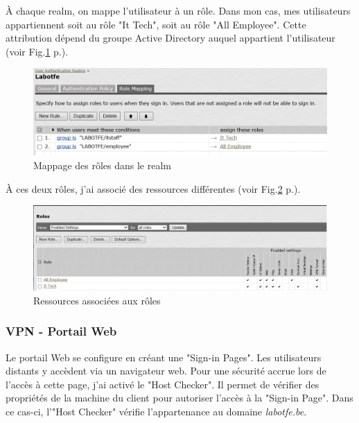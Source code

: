 À chaque realm, on mappe l'utilisateur à un rôle.
Dans mon cas, mes utilisateurs appartiennent soit au rôle "It Tech", soit au rôle "All Employee".
Cette attribution dépend du groupe Active Directory auquel appartient l'utilisateur (voir Fig.\ref{fig:mapRoles} p.\pageref{fig:mapRoles}). 
\begin{figure}[ht]
	\centering
	\includegraphics[width=16cm]{juniper/Rolemapping.png}
	\caption{Mappage des rôles dans le realm}
	\label{fig:mapRoles}
\end{figure}

À ces deux rôles, j'ai associé des ressources différentes (voir Fig.\ref{fig:resRoles} p.\pageref{fig:resRoles}).
\begin{figure}[ht]
	\centering
	\includegraphics[width=16cm]{juniper/UserRoles.png}
	\caption{Ressources associées aux rôles}
	\label{fig:resRoles}
\end{figure}

\subsubsection{VPN - Portail Web}
Le portail Web se configure en créant une "Sign-in Pages".
Les utilisateurs distants y accèdent via un navigateur web.
Pour une sécurité accrue lors de l'accès à cette page, j'ai activé le "Host Checker".
Il permet de vérifier des propriétés de la machine du client pour autoriser l'accès à la "Sign-in Page".
Dans ce cas-ci, l'"Host Checker" vérifie l'appartenance au domaine \textit{labotfe.be}. 


